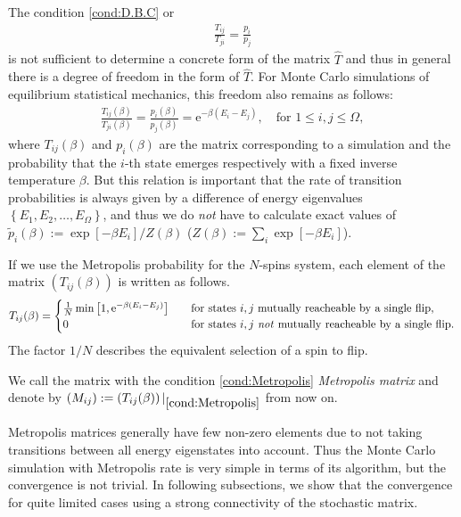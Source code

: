 The condition \eqref{cond:D.B.C} or
\begin{align}
\frac{T_{ij}}{T_{ji}} = \frac{p_{i}}{p_{j}}
\end{align}
is not sufficient to determine a concrete form of the matrix $\hat{T}$ and thus in general there is a degree of freedom in the form of $\hat{T}$. For Monte Carlo simulations of equilibrium statistical mechanics, this freedom also remains as follows:
\begin{align}
\frac{T_{ij}(\beta)}{T_{ji}(\beta)} = \frac{p_{i}(\beta)}{p_{j}(\beta)} = \mathrm{e}^{-\beta (E_{i}-E_{j})},\quad\text{for $1\leq i,j\leq \Omega$},
\end{align}
where ${T_{ij}(\beta)}$ and $p_{i}(\beta)$ are the matrix corresponding to a simulation and the probability that the $i$-th state emerges respectively with a fixed inverse temperature $\beta$. But this relation is important that the rate of transition probabilities is always given by a difference of energy eigenvalues $\left\{E_{1},E_{2},\dots,E_{\Omega}\right\}$, and thus we do \textit{not} have to calculate exact values of $\tilde{p}_{i}(\beta):=\exp\left[-\beta E_{i}\right]/Z(\beta)$ ($Z(\beta):=\sum_{i}\exp\left[-\beta E_{i}\right]$).

If we use the Metropolis probability for the $N$-spins system, each element of the matrix $\left(T_{ij}(\beta)\right)$ is written as follows.
\begin{align}
T_{ij}(\beta)=
\begin{cases}
\frac{1}{N}\min\left[1,\mathrm{e}^{-\beta (E_{i}-E_{j})}\right]\quad&\text{for states $i,j$ mutually reacheable by a single flip},\\
0\quad&\text{for states $i,j$ \textit{not} mutually reacheable by a single flip}.
\end{cases}\label{cond:Metropolis}
\end{align}
The factor $1/N$ describes the equivalent selection of a spin to flip.

We call the matrix with the condition \eqref{cond:Metropolis} \textit{Metropolis matrix} and denote by $\left(M_{ij}\right):=\left(T_{ij}(\beta)\right)|_{\eqref{cond:Metropolis}}$ from now on. 

Metropolis matrices generally have few non-zero elements due to not taking transitions between all energy eigenstates into account. Thus the Monte Carlo simulation with Metropolis rate is very simple in terms of its algorithm, but the convergence is not trivial. In following subsections, we show that the convergence for quite limited cases using a strong connectivity of the stochastic matrix.

